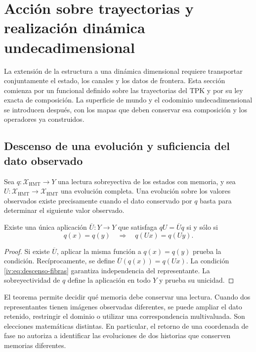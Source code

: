 \section{Acción sobre trayectorias y realización dinámica undecadimensional}
\label{iv:accion-realizacion}

La extensión de la estructura a una dinámica dimensional requiere
transportar conjuntamente el estado, los canales y los datos de
frontera. Esta sección comienza por un funcional definido sobre
las trayectorias del TPK y por su ley exacta de composición.
La superficie de mundo y el codominio undecadimensional se
introducen después, con los mapas que deben conservar esa
composición y los operadores ya construidos.

\subsection{Descenso de una evolución y suficiencia del dato observado}

Sea \(q:\mathcal X_{\mathrm{HMT}}\to Y\) una lectura
sobreyectiva de los estados con memoria, y sea
\(U:\mathcal X_{\mathrm{HMT}}\to\mathcal X_{\mathrm{HMT}}\)
una evolución completa. Una evolución sobre los valores
observados existe precisamente cuando el dato conservado por
\(q\) basta para determinar el siguiente valor observado.

\begin{theorem}
\label{iv:thm:descenso-fibras}
Existe una única aplicación \(\overline U:Y\to Y\)
que satisfaga \(qU=\overline Uq\) si y sólo si
\begin{equation}
 q(x)=q(y)\quad\Longrightarrow\quad q(Ux)=q(Uy).
 \label{iv:eq:descenso-fibras}
\end{equation}
\end{theorem}
\begin{proof}
Si existe \(\overline U\), aplicar la misma función a
\(q(x)=q(y)\) prueba la condición. Recíprocamente, se
define \(\overline U(q(x))=q(Ux)\). La condición
\eqref{iv:eq:descenso-fibras} garantiza independencia del
representante. La sobreyectividad de \(q\) define la
aplicación en todo \(Y\) y prueba su unicidad.
\end{proof}

El teorema permite decidir qué memoria debe conservar una
lectura. Cuando dos representantes tienen imágenes observadas
diferentes, se puede ampliar el dato retenido, restringir
el dominio o utilizar una correspondencia multivaluada.
Son elecciones matemáticas distintas. En particular, el
retorno de una coordenada de fase no autoriza a identificar
las evoluciones de dos historias que conserven memorias
diferentes.


